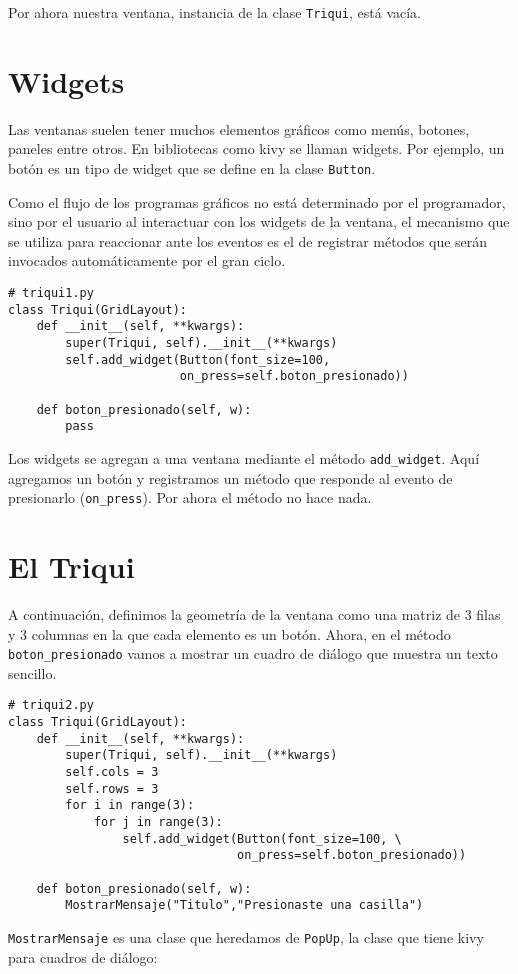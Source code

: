 Por ahora nuestra ventana, instancia de la clase \texttt{Triqui},
está vacía.

\section{Widgets}

Las ventanas suelen tener muchos elementos gráficos como menús, botones,
paneles entre otros. En bibliotecas como kivy se llaman widgets. Por
ejemplo, un botón es un tipo de widget que se define en la clase \texttt{Button}.

Como el flujo de los programas gráficos no está determinado por el
programador, sino por el usuario al interactuar con los widgets de
la ventana, el mecanismo que se utiliza para reaccionar ante los eventos
es el de registrar métodos que serán invocados automáticamente por
el gran ciclo.

\begin{lstlisting}
# triqui1.py
class Triqui(GridLayout):
    def __init__(self, **kwargs):
        super(Triqui, self).__init__(**kwargs)
        self.add_widget(Button(font_size=100, 
                        on_press=self.boton_presionado))
    
    def boton_presionado(self, w):
        pass
\end{lstlisting}
Los widgets se agregan a una ventana mediante el método \texttt{add\_widget}.
Aquí agregamos un botón y registramos un método que responde al evento
de presionarlo (\texttt{on\_press}). Por ahora el método no hace nada.

\section{El Triqui}

A continuación, definimos la geometría de la ventana como una matriz
de 3 filas y 3 columnas en la que cada elemento es un botón. Ahora,
en el método \texttt{boton\_presionado} vamos a mostrar un cuadro
de diálogo que muestra un texto sencillo.

\begin{lstlisting}
# triqui2.py
class Triqui(GridLayout):
    def __init__(self, **kwargs):
        super(Triqui, self).__init__(**kwargs)
        self.cols = 3
        self.rows = 3
        for i in range(3):
            for j in range(3):
                self.add_widget(Button(font_size=100, \
                                on_press=self.boton_presionado))
        
    def boton_presionado(self, w):
        MostrarMensaje("Titulo","Presionaste una casilla")
\end{lstlisting}
\texttt{MostrarMensaje} es una clase que heredamos de \texttt{PopUp},
la clase que tiene kivy para cuadros de diálogo:

